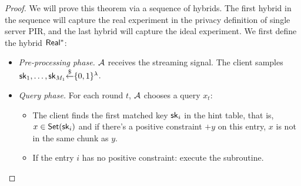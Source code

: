 
\begin{proof}
    
    We will prove this theorem via a sequence of hybrids. The first hybrid in the sequence will capture the real experiment in the privacy definition of single server PIR, and the last hybrid will capture the ideal experiment.
    We first define the hybrid ${\sf Real^*}$:
    
    \begin{itemize}
        \item \textit{Pre-processing phase.} $\mathcal{A}$ receives the streaming signal. The client samples $\mathsf{sk}_1,\dots,\mathsf{sk}_{M_1}{\overset{\$}{\leftarrow}}\{0,1\}^\lambda$. %
        \item \textit{Query phase.} For each round $t$, $\mathcal{A}$ chooses a query $x_t$:
        \begin{itemize}
            \item The client finds the first matched key $\mathsf{sk}_i$ in the hint table, that is, $x\in\mathsf{Set}(\mathsf{sk}_i)$ and if there's a positive constraint $+y$ on this entry, $x$ is not in the same chunk as $y$. 
            
            \item If the entry $i$ has no positive constraint: execute the subroutine.
            

\end{itemize}
\end{itemize}
\end{proof}
